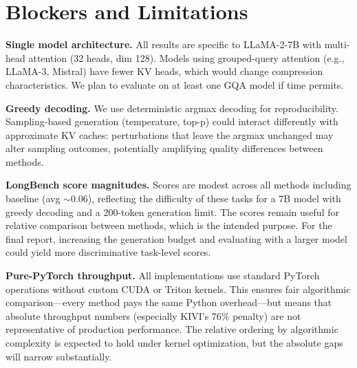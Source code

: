 \documentclass[conference]{IEEEtran}
\begin{document}
\section{Blockers and Limitations}

\textbf{Single model architecture.} All results are specific to LLaMA-2-7B with multi-head attention (32 heads, dim 128). Models using grouped-query attention (e.g., LLaMA-3, Mistral) have fewer KV heads, which would change compression characteristics. We plan to evaluate on at least one GQA model if time permits.

\textbf{Greedy decoding.} We use deterministic argmax decoding for reproducibility. Sampling-based generation (temperature, top-p) could interact differently with approximate KV caches: perturbations that leave the argmax unchanged may alter sampling outcomes, potentially amplifying quality differences between methods.

\textbf{LongBench score magnitudes.} Scores are modest across all methods including baseline (avg $\sim$0.06), reflecting the difficulty of these tasks for a 7B model with greedy decoding and a 200-token generation limit. The scores remain useful for relative comparison between methods, which is the intended purpose. For the final report, increasing the generation budget and evaluating with a larger model could yield more discriminative task-level scores.

\textbf{Pure-PyTorch throughput.} All implementations use standard PyTorch operations without custom CUDA or Triton kernels. This ensures fair algorithmic comparison---every method pays the same Python overhead---but means that absolute throughput numbers (especially KIVI's 76\% penalty) are not representative of production performance. The relative ordering by algorithmic complexity is expected to hold under kernel optimization, but the absolute gaps will narrow substantially.


\end{document}

